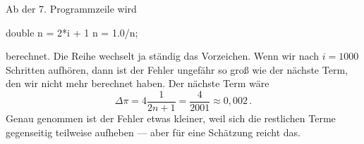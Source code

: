     Ab der 7. Programmzeile wird
\begin{code}
double n = 2*i + 1
n = 1.0/n;
\end{code}
  berechnet. Die Reihe wechselt ja ständig das Vorzeichen. Wenn wir nach $i=1000$ Schritten aufhören, dann ist der Fehler ungefähr so groß wie der nächste Term, den wir nicht mehr berechnet haben. Der nächste Term wäre
\begin{equation*}
  \Delta\pi = 4\frac{1}{2 n + 1} = \frac{4}{2001} \approx 0,002\,.
\end{equation*}
  Genau genommen ist der Fehler etwas kleiner, weil sich die restlichen Terme gegenseitig teilweise aufheben — aber für eine Schätzung reicht das.
